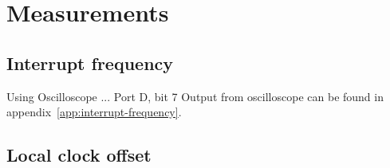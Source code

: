 
\chapter{Measurements}

\section{Interrupt frequency}
Using Oscilloscope ...
Port D, bit 7
Output from oscilloscope
can be found in appendix~\ref{app:interrupt-frequency}.

\section{Local clock offset}
